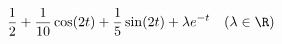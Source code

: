 \begin{displaymath}
 \frac{1}{2}+\frac{1}{10}\cos (2t) + \frac{1}{5}\sin (2t) +\lambda e^{-t} \quad (\lambda \in \R)
\end{displaymath}
